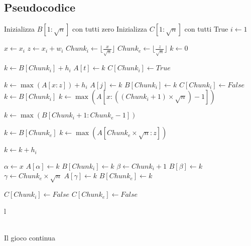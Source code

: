 \documentclass{article}
\begin{document}
\subsection{Pseudocodice}
\begin{algorithmic}
		\State Inizializza $B[1:\sqrt{n}]$ con tutti zero 
		\State Inizializza $C[1:\sqrt{n}]$ con tutti True 
		\State $i \gets 1$ 
	
		 
			\State $x \gets x_i$
			\State $z \gets x_i + w_i$
			\State $Chunk_i \gets \lfloor \frac{x}{\sqrt{n}} \rfloor$
			\State $Chunk_e \gets \lfloor \frac{z}{\sqrt{n}} \rfloor$
			\State $k \gets 0$
	
				\State $k \gets B[Chunk_i] + h_i$
				 
				\State $A[t] \gets k$
				\EndFor
			\State $C[Chunk_i] \gets True$
			\EndIf
	
			 
				\State $k \gets \max(A[x:z]) + h_i$ 
				 
					\State $A[j] \gets k$
				\EndFor
					\State $B[Chunk_i] \gets k$
				\EndIf
				\State $C[Chunk_i] \gets False$
			\Else
					\State $k \gets B[Chunk_i]$
				\Else
					\State $k \gets \max(A[x : ((Chunk_i +1) \times \sqrt{n}) - 1])$ 
				\EndIf
				
					\State $k \gets \max(B[Chunk_i + 1 : Chunk_e -1])$ 
				\EndIf				
				
					\State $k \gets B[Chunk_e] $
				\Else
					\State $k \gets \max(A[Chunk_e \times \sqrt{n} : z])$  
				\EndIf
				
				\State $k \gets k +h_i$
				
				\State $ \alpha \gets x$
				 
					\State $A[\alpha] \gets k$
				\EndFor
					\State $B[Chunk_i] \gets k$
				\EndIf
				\State $ \beta \gets Chunk_i + 1$
				 
					\State $B[\beta] \gets k$
				\EndFor
				\State $ \gamma \gets Chunk_e \times \sqrt{n}$
				 
					\State $A[\gamma] \gets k$
				\EndFor
					\State $B[Chunk_e] \gets k$
				\EndIf
				
				\State $C[Chunk_i] \gets False$
				\State $C[Chunk_e] \gets False$
			\EndIf
	
				\Return l
			\EndIf
		
		\EndFor
		\\\Return Il gioco continua
	
	\EndFunction
\end{algorithmic}
\end{document}
